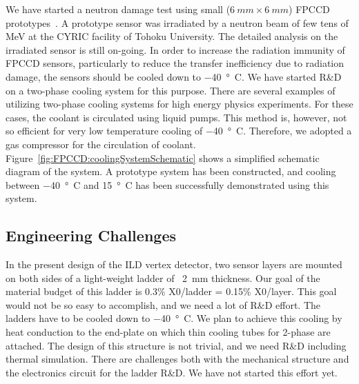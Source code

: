 We have started a neutron damage test using small ($\SI{6}{mm}\times\SI{6}{mm}$) FPCCD prototypes~\cite{lcws:fpccd:ito:2013,Murai:2017pyh}. A prototype sensor was irradiated by a neutron beam of few tens of MeV at the CYRIC facility of Tohoku University. The detailed analysis on the irradiated sensor is still on-going.
In order to increase the radiation immunity of FPCCD sensors, particularly to reduce the transfer inefficiency due to radiation damage, the sensors should be cooled down to \SI{-40}{\degree C}. We have started R\&D on a two-phase  cooling system for this purpose. There are several examples of utilizing two-phase  cooling systems for high energy physics experiments. For these cases, the  coolant is circulated using liquid pumps. This method is, however, not so efficient for very low temperature cooling of \SI{-40}{\degree C}. Therefore, we adopted a  gas compressor for the circulation of  coolant. Figure~\ref{fig:FPCCD:coolingSystemSchematic} shows a simplified schematic diagram of the system. A prototype system has been constructed, and cooling between \SI{-40}{\degree C} and \SI{+15}{\degree C} has been successfully demonstrated using this system.

\subsection{Engineering Challenges}
    In the present design of the ILD vertex detector, two sensor layers are mounted on both sides of a light-weight ladder of ~\SI{2}{mm} thickness. Our goal of the material budget of this ladder is 0.3\% X0/ladder = 0.15\% X0/layer. This goal would not be so easy to accomplish, and we need a lot of R\&D effort.
    The ladders have to be cooled down to \SI{-40}{\degree C}. We plan to achieve this cooling by heat conduction to the end-plate on which thin cooling tubes for 2-phase  are attached. The design of this structure is not trivial, and we need R\&D including thermal simulation.
    There are challenges both with the mechanical structure and the electronics circuit for the ladder R\&D. We have not started this effort yet.
